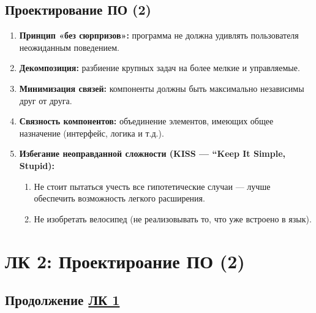 \documentclass[a4paper, 12pt]{article}
\newcommand{\term}[1]{\textbf{#1}} %
\begin{document}
\subsection*{Проектирование ПО (2)}
\begin{enumerate}
    \item \term{Принцип «без сюрпризов»:} программа не должна удивлять пользователя неожиданным поведением.
    \item \term{Декомпозиция:} разбиение крупных задач на более мелкие и управляемые.
    \item \term{Минимизация связей:} компоненты должны быть максимально независимы друг от друга.
    \item \term{Связность компонентов:} объединение элементов, имеющих общее назначение (интерфейс, логика и т.д.).
    \item \term{Избегание неоправданной сложности (KISS --- ``Keep It Simple, Stupid):}
    \begin{enumerate}
        \item Не стоит пытаться учесть все гипотетические случаи — лучше обеспечить возможность легкого расширения.
        \item Не изобретать велосипед (не реализовывать то, что уже встроено в язык).
    \end{enumerate}
\end{enumerate}

\newpage

\section{ЛК 2: Проектироание ПО (2)}
\label{sec:l2}

\subsection*{Продолжение \hyperref[sec:l1]{ЛК 1}}    
\end{document}
